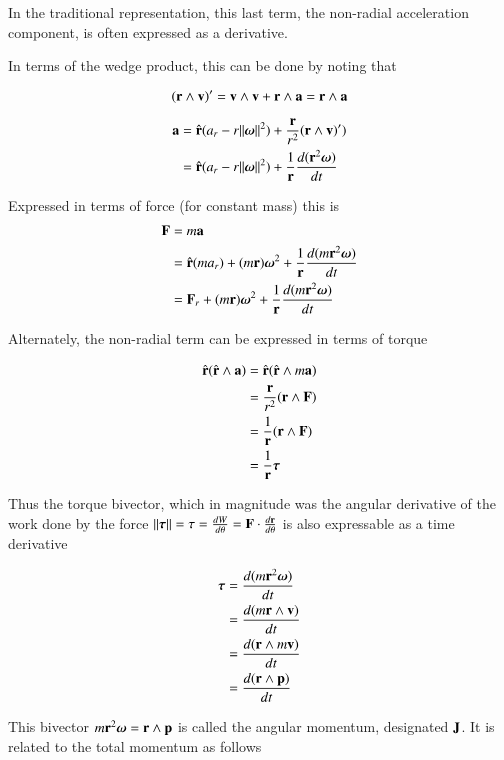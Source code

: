 \documentclass{article}      %
\newcommand{\dt}[1]{\frac{d {#1}}{dt}}
\newcommand{\dtheta}[1]{\frac{d {#1}}{d \theta}}
\begin{document}
In the traditional representation, this last term, the non-radial acceleration
component, is often expressed as a derivative.

In terms of the wedge product, this can be done by noting that

\[
(\mathbf{r} \wedge \mathbf{v})' = \mathbf{v} \wedge \mathbf{v} + \mathbf{r} \wedge \mathbf{a} = \mathbf{r} \wedge \mathbf{a}
\]

\begin{align*}
\Ba 
   &= \rcap( a_r - r \norm{\Bomega}^2 ) + \frac{\Br}{r^2}(\Br \wedge \Bv)') \\
   &= \rcap( a_r - r \norm{\Bomega}^2 ) + \frac{1}{\Br}\dt{(\Br^2 \Bomega)} \\
\end{align*}

Expressed in terms of force (for constant mass) this is
\begin{align*}
\BF &= m \Ba \\
    &= \rcap (m a_r) + (m \Br) {\Bomega}^2
       + \frac{1}{\Br}\dt{(m \Br^2 \Bomega)} \\
    &= \BF_r + (m \Br) {\Bomega}^2
             + \frac{1}{\Br}\dt{(m \Br^2 \Bomega)} \\
\end{align*}

Alternately, the non-radial term can be expressed in terms of torque

\begin{align*}
\hat{\mathbf{r}} (\hat{\mathbf{r}} \wedge \mathbf{a}) 
   &= \hat{\mathbf{r}} (\hat{\mathbf{r}} \wedge m \mathbf{a})  \\
   &= \frac{\mathbf{r}}{r^2} (\mathbf{r} \wedge \mathbf{F})  \\
   &= \frac{1}{\mathbf{r}} (\mathbf{r} \wedge \mathbf{F})  \\
   &= \frac{1}{\mathbf{r}} \boldsymbol{\tau} \\
\end{align*}

Thus the torque bivector, which in magnitude was the angular derivative of
the work
done by the force $\norm{\Btau} = \tau = \dtheta{W} = \BF \cdot \dtheta{\Br}$
is also expressable as a time derivative

\begin{align*}
\Btau 
&= \dt{( m \Br^2 \Bomega )}  \\
&= \dt{( m \Br \wedge \Bv)}  \\
&= \dt{( \Br \wedge m \Bv)}  \\
&= \dt{( \Br \wedge \Bp  )}  \\
\end{align*}

This bivector $m \mathbf{r}^2 \boldsymbol{\omega} = \mathbf{r} \wedge \mathbf{p}$ is called the angular
momentum, designated $\mathbf{J}$.  It is related to the total momentum as follows
\end{document}
